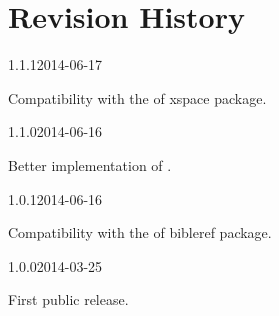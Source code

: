 \documentclass{ltxdockit}[2011/03/25]
\begin{document}
\section{Revision History}
\begin{changelog}

\begin{release}{1.1.1}{2014-06-17}
\item Compatibility with the  of xspace package.
\end{release}


\begin{release}{1.1.0}{2014-06-16}
\item Better implementation of  .
\end{release}

\begin{release}{1.0.1}{2014-06-16}
\item Compatibility with the  of bibleref package.
\end{release}

\begin{release}{1.0.0}{2014-03-25}
\item First public release.
\end{release}

\end{changelog}
\end{document}
